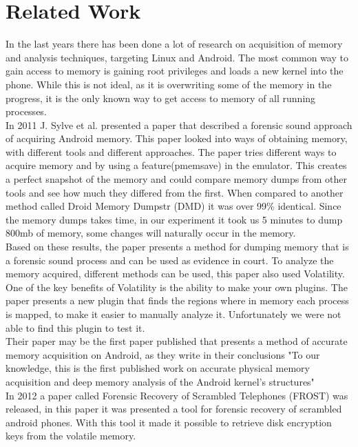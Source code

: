 \section{Related Work}
In the last years there has been done a lot of research on acquisition of memory
and analysis techniques, targeting Linux and Android. The most common way to 
gain access to memory is gaining root privileges and loads a new kernel into the 
phone. While this is not ideal, as it is overwriting some of the memory in the 
progress, it is the only known way to get access to memory of all running processes.\\

In 2011 J. Sylve et al. presented a paper that described a forensic sound 
approach of acquiring Android memory. \cite{acq_vol_android_mem} This paper looked 
into ways of obtaining memory, with different tools and different approaches. The paper 
tries different ways to acquire memory and by using a feature(pmemsave) in the emulator. 
This creates a perfect snapshot of the memory and could compare memory dumps from other 
tools and see how much they differed from the first. When compared to another method 
called Droid Memory Dumpstr (DMD) it was over 99\% identical. Since the memory dumps 
takes time, in our experiment it took us 5 minutes to dump 800mb of memory, some 
changes will naturally occur in the memory.\\

Based on these results, the paper presents a method for dumping memory that is a 
forensic sound process and can be used as evidence in court. To analyze the memory 
acquired, different methods can be used, this paper also used Volatility.
One of the key benefits of Volatility is the ability to make your 
own plugins. The paper presents a new plugin that finds the regions where in memory 
each process is mapped, to make it easier to manually analyze it. Unfortunately we were not 
able to find this plugin to test it.\\

Their paper may be the first paper published that presents a method of accurate memory acquisition on
Android, as they write in their conclusions "To our knowledge, this is the first published work on
accurate physical memory acquisition and deep memory analysis of the Android kernel's structures"\\

In 2012 a paper called Forensic Recovery of Scrambled Telephones (FROST) was 
released, in this paper it was presented a tool for forensic recovery of 
scrambled android phones. With this tool it made it possible to retrieve disk 
encryption keys from the volatile memory.\cite{frost_paper}\\


